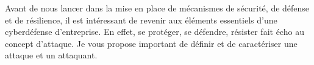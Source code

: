 %
%


Avant de nous lancer dans la mise en place de mécanismes de sécurité, de défense et de résilience, il est intéressant de revenir aux éléments essentiels d'une cyberdéfense d'entreprise. En effet, se protéger, se défendre, résister fait écho au concept d'attaque. Je vous propose important de définir et de caractériser une attaque et un attaquant. 

\utocomplete